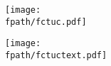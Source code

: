 \renewcommand{\fpath}{C00-Informative/Figures}

\begin{titlepage}
	\thispagestyle{empty}

	\begin{center}
		\texttt{[image: \\fpath/fctuc.pdf]}
		\par 	%
		\vspace{5mm}
		\texttt{[image: \\fpath/fctuctext.pdf]}
		\par

		\vspace{2cm}
		{\Huge\textbf{\ThesisTitle}\par}

		\vspace{2.5cm}
		{\large\textbf{\AuthorName}}

		\vfill
		{\large{\FinishDate}}

	\end{center}
\end{titlepage}
